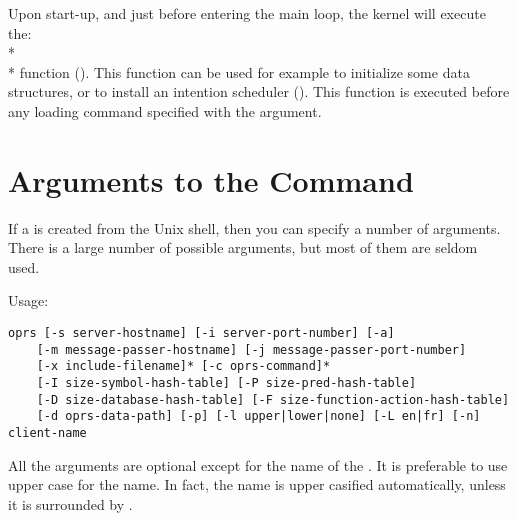 Upon start-up, and just before entering the \CPK{} main loop, the kernel will
execute the:\\*
\\*
function (). This function can be used for example to
initialize some data structures, or to install an intention scheduler
(). This function is executed before any
loading command specified with the  argument.

\section{Arguments to the \protect{} Command}

If a \CPK{} is created from the Unix shell, then you can specify a number of
arguments. There is a large number of possible arguments, but most of them are
seldom used.

Usage: 
\begin{verbatim}
oprs [-s server-hostname] [-i server-port-number] [-a]
    [-m message-passer-hostname] [-j message-passer-port-number]
    [-x include-filename]* [-c oprs-command]*
    [-I size-symbol-hash-table] [-P size-pred-hash-table]
    [-D size-database-hash-table] [-F size-function-action-hash-table]
    [-d oprs-data-path] [-p] [-l upper|lower|none] [-L en|fr] [-n] client-name
\end{verbatim}

All the arguments are optional except for the name of the \CPK{}.
It is preferable to use upper case for the name. In fact, the name is upper
casified automatically, unless it is surrounded by \samp{|}.

